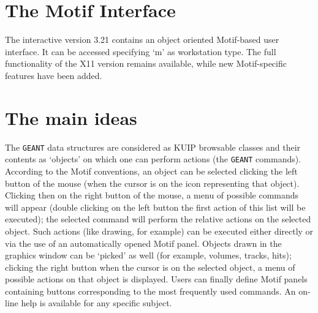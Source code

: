 \section{The Motif Interface}
The interactive version 3.21 contains an object oriented Motif-based user
interface. It can be accessed specifying `m' as workstation type.
The full functionality of the X11 version remains available, while new 
Motif-specific features have been added. \\[1em]
\section{The main ideas} 
The {\tt GEANT} data structures are 
considered as KUIP browsable classes and their
contents as `objects' on which one can perform actions 
(the {\tt GEANT} commands).
According to the Motif conventions, an object can be selected clicking the
left button of the mouse (when the cursor is on the icon representing that
object). Clicking then on the right button of the mouse, a menu of possible
commands will appear (double clicking on the left button the first action of
this list will be executed); 
the selected command will perform the relative actions
on the selected object. Such actions (like drawing, for example) can be
executed either directly or via the use of an automatically opened Motif panel.
Objects drawn in the graphics window can be `picked' as well (for example,
volumes, tracks, hits); clicking the right button when the cursor is on the
selected object, a menu of possible actions on that object is displayed.
Users can finally define Motif panels containing buttons corresponding to the
most frequently used commands. An on-line help is available for any specific
subject. \\[1em]

